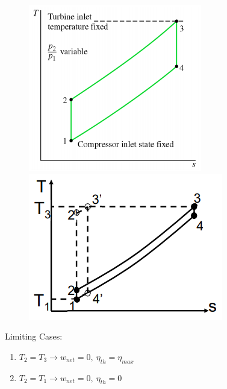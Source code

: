 \documentclass[class=report, crop=false, 12pt,a4paper]{standalone}
\numberwithin{equation}{section}
\begin{document}
\begin{figure}[H]
  \begin{center}
    \begin{minipage}[b]{0.46\textwidth}
      \centering
      \includegraphics[width = 0.85 \textwidth]{../img/diagram159.png}
      \caption{}
    \end{minipage}
    \begin{minipage}[b]{0.46\textwidth}
      \centering
      \includegraphics[width = 0.85 \textwidth]{../img/diagram160.png}
      \caption{}
    \end{minipage}
  \end{center}
\end{figure}
Limiting Cases:
\begin{enumerate}[noitemsep]
  \item $T_2 = T_3 \longrightarrow w_{net} = 0, \ \eta_{th} = \eta_{max}$
  \item $T_2 = T_1 \longrightarrow w_{net} = 0, \ \eta_{th} = 0$ 
\end{enumerate}
\end{document}
